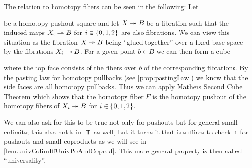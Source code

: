 The relation to homotopy fibers can be seen in the following:
Let 
\begin{center}
\end{center}
be a homotopy pushout square and let $X\xtwoheadrightarrow{} B$ be a fibration such that the induced maps $X_i\xtwoheadrightarrow{} B$ for $i\in\left\lbrace0,1,2\right\rbrace$ are also fibrations.
We can view this situation as the fibration $X\xtwoheadrightarrow{} B$ being ``glued together'' over a fixed base space by the fibrations $X_i\xtwoheadrightarrow{} B$.
For a given point $b\in B$ we can then form a cube 
\begin{center}
\end{center}
where the top face consists of the fibers over $b$ of the corresponding fibrations.
By the pasting law for homotopy pullbacks (see \cref{prop:pastingLaw}) we know that the side faces are all homotopy pullbacks.
Thus we can apply Mathers Second Cube Theorem which shows that the homotopy fiber $F$ is the homotopy pushout of the homotopy fibers of $X_i\xtwoheadrightarrow{} B$ for $i\in\left\lbrace0,1,2\right\rbrace$.

We can also ask for this to be true not only for pushouts but for general small colimits; 
this also  holds in $\Top$ as well, but it turns it that is suffices to check it for pushouts and small coproducts as we will see in \cref{lem:univColimIffUnivPoAndCoprod}.
This more general property is then called ``universality''.

